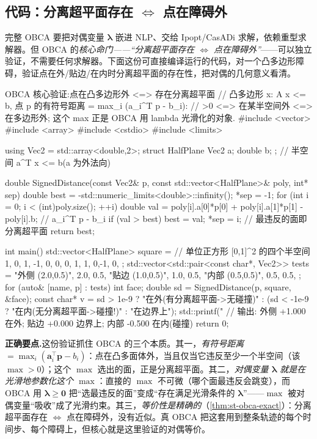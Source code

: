 \subsection{代码：分离超平面存在\texorpdfstring{ $\Leftrightarrow$ }{ <=> }点在障碍外}
\label{sec:st-obca-code}

完整 OBCA 要把对偶变量 $\boldsymbol\lambda$ 嵌进 NLP、交给 Ipopt/CasADi 求解，依赖重型求解器。但 OBCA 的\emph{核心命门——“分离超平面存在 $\Leftrightarrow$ 点在障碍外”}——可以独立验证，不需要任何求解器。下面这份可直接编译运行的代码，对一个凸多边形障碍，验证点在外/贴边/在内时分离超平面的存在性，把对偶的几何意义看清。

\begin{codebox}[C++]{OBCA 核心验证:点在凸多边形外 <=> 存在分离超平面}
// 凸多边形 {x: A x <= b}, 点 p 的有符号距离 = max_i (a_i^T p - b_i):
//   >0 <=> 在某半空间外 <=> 在多边形外; 这个 max 正是 OBCA 用 lambda 光滑化的对象.
#include <vector>
#include <array>
#include <cstdio>
#include <limits>

using Vec2 = std::array<double,2>;
struct HalfPlane { Vec2 a; double b; };          // 半空间 a^T x <= b(a 为外法向)

double SignedDistance(const Vec2& p, const std::vector<HalfPlane>& poly, int* sep) {
  double best = -std::numeric_limits<double>::infinity();
  *sep = -1;
  for (int i = 0; i < (int)poly.size(); ++i) {
    double val = poly[i].a[0]*p[0] + poly[i].a[1]*p[1] - poly[i].b;  // a_i^T p - b_i
    if (val > best) { best = val; *sep = i; }    // 最违反的面即分离超平面
  }
  return best;
}

int main() {
  std::vector<HalfPlane> square = {              // 单位正方形 [0,1]^2 的四个半空间
    {{ 1, 0}, 1}, {{-1, 0}, 0}, {{ 0, 1}, 1}, {{ 0,-1}, 0},
  };
  std::vector<std::pair<const char*, Vec2>> tests = {
    {"外侧 (2.0,0.5)", {2.0, 0.5}},
    {"贴边 (1.0,0.5)", {1.0, 0.5}},
    {"内部 (0.5,0.5)", {0.5, 0.5}},
  };
  for (auto& [name, p] : tests) {
    int face;
    double sd = SignedDistance(p, square, &face);
    const char* v = sd > 1e-9 ? "在外(有分离超平面->无碰撞)"
                  : (sd < -1e-9 ? "在内(无分离超平面->碰撞!)" : "在边界上");
    std::printf("%
  }
  // 输出: 外侧 +1.000 在外; 贴边 +0.000 边界上; 内部 -0.500 在内(碰撞)
  return 0;
}
\end{codebox}

\noindent\textbf{正确要点.}\;这份验证抓住 OBCA 的三个本质。其一，\emph{有符号距离} $=\max_i(\mathbf a_i^\top\mathbf p-b_i)$：点在凸多面体外，当且仅当它违反至少一个半空间（该 $\max>0$）；这个 $\max$ 选出的面，正是分离超平面。其二，\emph{对偶变量 $\boldsymbol\lambda$ 就是在光滑地参数化这个 $\max$}：直接的 $\max$ 不可微（哪个面最违反会跳变），而 OBCA 用 $\boldsymbol\lambda\ge\mathbf 0$ 把“选最违反的面”变成“存在满足光滑条件的 $\boldsymbol\lambda$”——$\max$ 被对偶变量“吸收”成了光滑约束。其三，\emph{等价性是精确的}（\cref{thm:st-obca-exact}）：分离超平面存在 $\Leftrightarrow$ 点在障碍外，没有近似。真 OBCA 把这套用到整条轨迹的每个时间步、每个障碍上，但核心就是这里验证的对偶等价。

